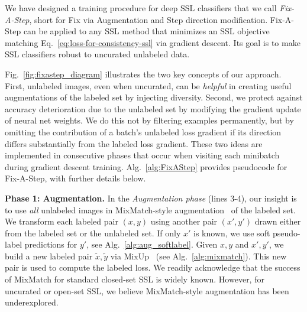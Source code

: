 We have designed a training procedure for deep SSL classifiers that we call \emph{Fix-A-Step}, short for Fix via Augmentation and Step direction modification.
Fix-A-Step can be applied to any SSL method that minimizes an SSL objective matching Eq.~\eqref{eq:loss-for-consistency-ssl} via gradient descent.
Its goal is to make SSL classifiers robust to uncurated unlabeled data.

Fig.~\ref{fig:fixastep_diagram} illustrates the two key concepts of our approach.
First, unlabeled images, even when uncurated, can be \emph{helpful} in creating useful augmentations of the labeled set by injecting diversity.
Second, we protect against accuracy deterioration due to the unlabeled set by modifying the gradient update of neural net weights.
We do this not by filtering examples permanently, but by omitting the contribution of a batch's unlabeled loss gradient if its direction differs substantially from the labeled loss gradient. 
These two ideas are implemented in consecutive phases that occur when visiting each minibatch during gradient descent training.
Alg.~\ref{alg:FixAStep} provides pseudocode for Fix-A-Step, with further details below.

\textbf{Phase 1: Augmentation.} In the \emph{Augmentation phase} (lines 3-4), our insight is to use \emph{all} unlabeled images in MixMatch-style augmentation~\citep{berthelotMixMatchHolisticApproach2019} of the labeled set.
We transform each labeled pair $(x,y)$ using another pair $(x', y')$ drawn either from the labeled set or the unlabeled set.
If only $x'$ is known, we use soft pseudo-label predictions for $y'$, see Alg.~\ref{alg:aug_softlabel}. 
Given $x, y$ and $x', y'$, we build a new labeled pair $\tilde{x}, \tilde{y}$ via MixUp~\citep{zhangMixupEmpiricalRisk2017} (see Alg.~\ref{alg:mixmatch}).
This new pair is used to compute the labeled loss. 
We readily acknowledge that the success of MixMatch for standard closed-set SSL is widely known.
However, for uncurated or open-set SSL, we believe MixMatch-style augmentation has been underexplored.


